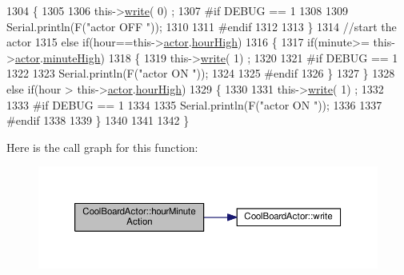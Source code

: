 \begin{DoxyCode}
1304     \{
1305 
1306         this->\hyperlink{class_cool_board_actor_a958786ff01ea1056ee72c72d439f86da}{write}( 0) ;
1307 \textcolor{preprocessor}{    #if DEBUG == 1 }
1308 
1309         Serial.println(F(\textcolor{stringliteral}{"actor OFF "}));
1310 
1311 \textcolor{preprocessor}{    #endif  }
1312     
1313     \}
1314     \textcolor{comment}{//start the actor}
1315     \textcolor{keywordflow}{else} \textcolor{keywordflow}{if}(hour==this->\hyperlink{class_cool_board_actor_a8f190db9f7a39fddbcef7f152da970e9}{actor}.\hyperlink{struct_cool_board_actor_1_1state_acd1af3ac2382258a5b05497d814adc01}{hourHigh})
1316     \{
1317         \textcolor{keywordflow}{if}(minute>= this->\hyperlink{class_cool_board_actor_a8f190db9f7a39fddbcef7f152da970e9}{actor}.\hyperlink{struct_cool_board_actor_1_1state_a4bff3d61ead74adb60be224764b93006}{minuteHigh})
1318         \{
1319             this->\hyperlink{class_cool_board_actor_a958786ff01ea1056ee72c72d439f86da}{write}( 1) ;
1320 
1321 \textcolor{preprocessor}{        #if DEBUG == 1 }
1322 
1323             Serial.println(F(\textcolor{stringliteral}{"actor ON "}));
1324 
1325 \textcolor{preprocessor}{        #endif  }
1326         \}
1327     \}
1328     \textcolor{keywordflow}{else} \textcolor{keywordflow}{if}(hour > this->\hyperlink{class_cool_board_actor_a8f190db9f7a39fddbcef7f152da970e9}{actor}.\hyperlink{struct_cool_board_actor_1_1state_acd1af3ac2382258a5b05497d814adc01}{hourHigh})
1329     \{
1330 
1331         this->\hyperlink{class_cool_board_actor_a958786ff01ea1056ee72c72d439f86da}{write}( 1) ;
1332 
1333 \textcolor{preprocessor}{    #if DEBUG == 1 }
1334 
1335         Serial.println(F(\textcolor{stringliteral}{"actor ON "}));
1336 
1337 \textcolor{preprocessor}{    #endif      }
1338 
1339     \}
1340 
1341     
1342 \}
\end{DoxyCode}
Here is the call graph for this function\+:
\nopagebreak
\begin{figure}[H]
\begin{center}
\leavevmode
\includegraphics[width=350pt]{dc/d69/class_cool_board_actor_a1eb1fbca19bc80aad20d2686d52317f8_cgraph}
\end{center}
\end{figure}
